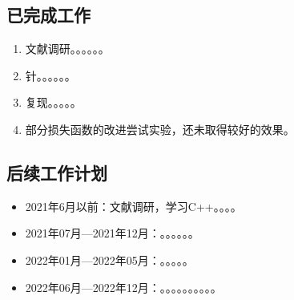 \documentclass[UTF8,a4paper,11pt]{ctexart}
\begin{document}
\begin{sloppypar}
	\subsection{已完成工作}
	\begin{enumerate}
		\item 文献调研\cite{wang2020deep,2021KnowledgeDistillation,lightfieldcamera}。。。。。。
		\item 针。。。。。。
		\item 复现。。。。。
		\item 部分损失函数的改进尝试实验，还未取得较好的效果。
		
	\end{enumerate}
	\subsection{后续工作计划}
	\begin{itemize}
		\item 2021年6月以前：文献调研，学习C++。。。。
		
		\item 2021年07月—2021年12月：。。。。。。
		
		\item 2022年01月—2022年05月：。。。。。
		
		\item 2022年06月—2022年12月：。。。。。。。。。。
	\end{itemize}
	
	
	
\end{sloppypar}
	
\end{document}
